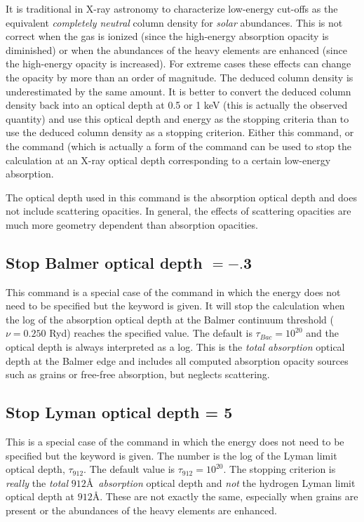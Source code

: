 It is traditional in X-ray astronomy to characterize low-energy cut-offs
as the equivalent \emph{completely neutral} column density
for \emph{solar} abundances.
This is not correct when the gas is ionized
(since the high-energy absorption
opacity is diminished) or when the abundances of the heavy elements are
enhanced (since the high-energy opacity is increased).
For extreme cases
these effects can change the opacity by more than an order of magnitude.
The deduced column density is underestimated by the same amount.
It is
better to convert the deduced column density back into an optical depth
at 0.5 or 1 keV (this is actually the observed quantity)
and use this optical
depth and energy as the stopping criteria than to use the deduced column
density as a stopping criterion.
Either this command, or the  command (which is actually a form of the
 command can be used to stop
the calculation
at an X-ray optical depth corresponding to a certain low-energy absorption.

The optical depth used in this command is the absorption optical depth
and does not include scattering opacities.
In general, the effects of
scattering opacities are much more geometry dependent than absorption
opacities.

\subsection{Stop Balmer optical depth $= -.$3}

This command is a special case of the 
command in which the energy does not need to be specified
but the keyword  is given.
It will stop the calculation when the log of the absorption
optical depth
at the Balmer continuum threshold ($\nu = 0.250$ Ryd)
reaches the specified value.
The default is $\tau_{Bac} = 10^{20}$ and the optical depth
is always interpreted as a log.
This is the \emph{total absorption} optical depth at the Balmer edge
and includes all computed absorption opacity sources such as grains or
free-free absorption, but neglects scattering.

\subsection{Stop Lyman optical depth = 5}

This is a special case of the  command
in which the
energy does not need to be specified but the keyword  is given.
The
number is the log of the Lyman limit optical depth, $\tau_{912}$.
The default value
is $\tau_{912} = 10^{20}$.
The stopping criterion is \emph{really} the
\emph{total} $912$\AA\ \emph{absorption}
optical depth and \emph{not} the hydrogen Lyman limit optical depth at $912$\AA.
These are not exactly the same, especially when grains
are present or the
abundances of the heavy elements are enhanced.


